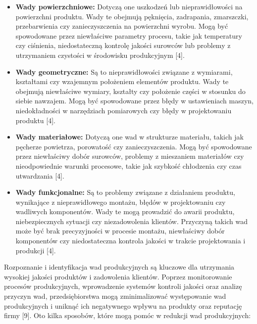 \begin{itemize}
\item \textbf{Wady powierzchniowe:} Dotyczą one uszkodzeń lub nieprawidłowości na powierzchni produktu. Wady te obejmują pęknięcia, zadrapania, zmarszczki, przebarwienia czy zanieczyszczenia na powierzchni wyrobu. Mogą być spowodowane przez niewłaściwe parametry procesu, takie jak temperatury czy ciśnienia, niedostateczną kontrolę jakości surowców lub problemy z utrzymaniem czystości w środowisku produkcyjnym [4].

\item \textbf{Wady geometryczne:} Są to nieprawidłowości związane z wymiarami, kształtami czy wzajemnym położeniem elementów produktu. Wady te obejmują niewłaściwe wymiary, kształty czy położenie części w stosunku do siebie nawzajem. Mogą być spowodowane przez błędy w ustawieniach maszyn, niedokładności w narzędziach pomiarowych czy błędy w projektowaniu produktu [4].

\item \textbf{Wady materiałowe:} Dotyczą one wad w strukturze materiału, takich jak pęcherze powietrza, porowatość czy zanieczyszczenia. Mogą być spowodowane przez niewłaściwy dobór surowców, problemy z mieszaniem materiałów czy nieodpowiednie warunki procesowe, takie jak szybkość chłodzenia czy czas utwardzania [4].

\item \textbf{Wady funkcjonalne:} Są to problemy związane z działaniem produktu, wynikające z nieprawidłowego montażu, błędów w projektowaniu czy wadliwych komponentów. Wady te mogą prowadzić do awarii produktu, niebezpiecznych sytuacji czy niezadowolenia klientów. Przyczyną takich wad może być brak precyzyjności w procesie montażu, niewłaściwy dobór komponentów czy niedostateczna kontrola jakości w trakcie projektowania i produkcji [4].

\end{itemize}

Rozpoznanie i identyfikacja wad produkcyjnych są kluczowe dla utrzymania wysokiej jakości produktów i zadowolenia klientów. Poprzez monitorowanie procesów produkcyjnych, wprowadzenie systemów kontroli jakości oraz analizę przyczyn wad, przedsiębiorstwa mogą zminimalizować występowanie wad produkcyjnych i uniknąć ich negatywnego wpływu na produkty oraz reputację firmy [9]. Oto kilka sposobów, które mogą pomóc w redukcji wad produkcyjnych:

